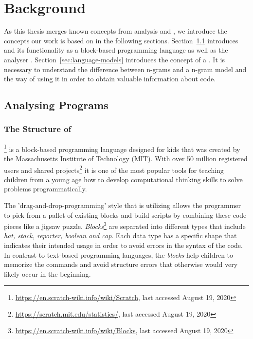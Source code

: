 \chapter{Background}\label{chap:background}
As this thesis merges known concepts from \scratch{} analysis and \ngram{}, we introduce the concepts our work is based on in the following sections. Section~\ref{sec:analysing-scratch} introduces \scratch{} and its functionality as a block-based programming language as well as the \scratch{} analyser \litterbox{}. Section~\ref{sec:language-models} introduces the concept of a \ngram{}. It is necessary to understand the difference between n-grams and a n-gram model and the way of using it in order to obtain valuable information about \scratch{} code.


\section{Analysing \scratch{} Programs}\label{sec:analysing-scratch}

\subsection{The Structure of \scratch{}}\label{subsec:scratch}
\scratch{}\footnote{\url{https://en.scratch-wiki.info/wiki/Scratch}, last accessed August 19, 2020} is a block-based programming language designed for kids that was created by the Massachusetts Institute of Technology (MIT). With over 50 million registered users and shared projects\footnote{\url{https://scratch.mit.edu/statistics/}, last accessed August 19, 2020} it is one of the most popular tools for teaching children from a young age how to develop computational thinking skills to solve problems programmatically.

The 'drag-and-drop-programming' style that \scratch{} is utilizing allows the programmer to pick from a pallet of existing blocks and build scripts by combining these code pieces like a jigsaw puzzle.
\textit{Blocks}\footnote{\url{https://en.scratch-wiki.info/wiki/Blocks}, last accessed August 19, 2020} are separated into different types that include \textit{hat, stack, reporter, boolean and cap}. Each data type has a specific shape that indicates their intended usage in order to avoid errors in the syntax of the code. In contrast to text-based programming languages, the \textit{blocks} help children to memorize the commands and avoid structure errors that otherwise would very likely occur in the beginning. 

